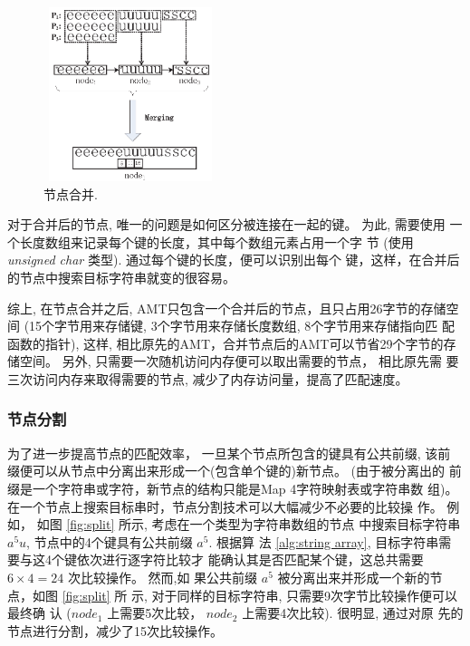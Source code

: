 \begin{figure}[!h]
  \centering
  \includegraphics[height=2in, width=2in]{figures/2_MPM/node_merge}
  \caption{节点合并.}
  \label{fig:merge}
\end{figure}

对于合并后的节点, 唯一的问题是如何区分被连接在一起的键。 为此, 需要使用
一个长度数组来记录每个键的长度，其中每个数组元素占用一个字
节 (使用 \emph{unsigned char} 类型). 通过每个键的长度，便可以识别出每个
键，这样，在合并后的节点中搜索目标字符串就变的很容易。

综上, 在节点合并之后, AMT只包含一个合并后的节点，且只占用26字节的存储空
间 (15个字节用来存储键, 3个字节用来存储长度数组, 8个字节用来存储指向匹
配函数的指针), 这样, 相比原先的AMT，合并节点后的AMT可以节省29个字节的存
储空间。 另外, 只需要一次随机访问内存便可以取出需要的节点， 相比原先需
要三次访问内存来取得需要的节点, 减少了内存访问量，提高了匹配速度。


\subsubsection{节点分割}
\label{sec:node split}

为了进一步提高节点的匹配效率， 一旦某个节点所包含的键具有公共前缀, 该前
缀便可以从节点中分离出来形成一个(包含单个键的)新节点。 (由于被分离出的
前缀是一个字符串或字符，新节点的结构只能是Map 4字符映射表或字符串数
组)。 在一个节点上搜索目标串时，节点分割技术可以大幅减少不必要的比较操
作。 例如， 如图 \ref{fig:split} 所示, 考虑在一个类型为字符串数组的节点
中搜索目标字符串 $a^5u$, 节点中的4个键具有公共前缀 $a^5$. 根据算
法 \ref{alg:string array}, 目标字符串需要与这4个键依次进行逐字符比较才
能确认其是否匹配某个键，这总共需要 $6 \times 4 = 24$ 次比较操作。 然而,如
果公共前缀 $a^5$ 被分离出来并形成一个新的节点，如图 \ref{fig:split} 所
示, 对于同样的目标字符串, 只需要9次字节比较操作便可以最终确
认 ($node_1$ 上需要5次比较， $node_2$ 上需要4次比较). 很明显, 通过对原
先的节点进行分割，减少了15次比较操作。

